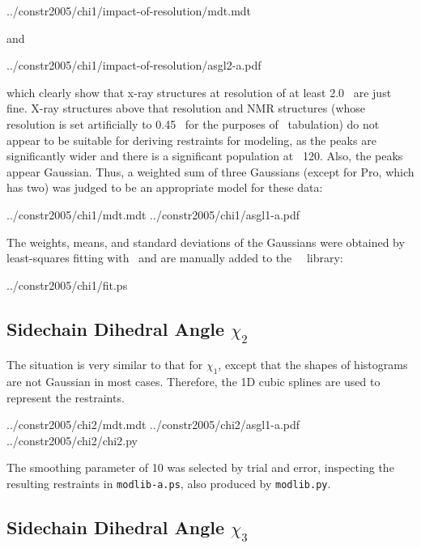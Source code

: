            {../constr2005/chi1/impact-of-resolution/mdt.mdt}

and 

           {../constr2005/chi1/impact-of-resolution/asgl2-a.pdf}

\noindent which clearly show that x-ray structures at resolution of at least 2.0 \Ang\ are just fine. X-ray 
structures above that resolution and NMR structures (whose resolution is set artificially to 
0.45 \Ang\ for the purposes of \MDT\ tabulation) do not appear to be suitable for deriving restraints
for modeling, as the peaks are significantly wider and there is a significant population at ~120\degr. 
Also, the peaks appear Gaussian. Thus, a weighted sum of three Gaussians (except for Pro, which has two) 
was judged to be an appropriate model for these data:

           {../constr2005/chi1/mdt.mdt}
           {../constr2005/chi1/asgl1-a.pdf}

The weights, means, and standard deviations of the Gaussians were obtained by least-squares fitting
with \ASGL\ and are manually added to the \MODELLER\ \MDT\ library:

           {../constr2005/chi1/fit.ps}

\subsection{Sidechain Dihedral Angle $\chi_2$}

The situation is very similar to that for $\chi_1$, except that the shapes of histograms are
not Gaussian in most cases. Therefore, the 1D cubic splines are used to represent the restraints.

           {../constr2005/chi2/mdt.mdt}
           {../constr2005/chi2/asgl1-a.pdf}
           {../constr2005/chi2/chi2.py}

The smoothing parameter  of 10 was selected by trial and
error, inspecting the resulting restraints in 
{\tt modlib-a.ps}, also produced by {\tt modlib.py}.


\subsection{Sidechain Dihedral Angle $\chi_3$}

